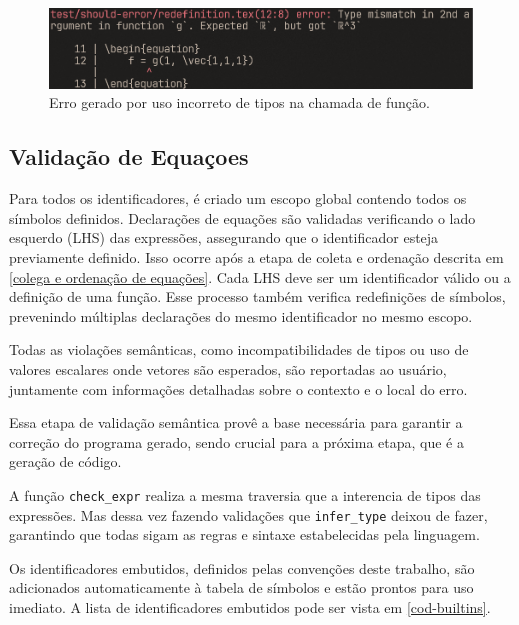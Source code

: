 \begin{figure}[H]
    \caption{\label{fig-type-mismatch} \small Erro gerado por uso incorreto de tipos na chamada de função.}
    \begin{center}
        \includegraphics[scale=0.5]{./Imagens/error-type-mismatch.png}
    \end{center}
\end{figure}

\subsection{Validação de Equaçoes}

Para todos os identificadores, é criado um escopo global contendo todos os símbolos definidos. Declarações de equações são validadas verificando o lado esquerdo (LHS) das expressões, assegurando que o identificador esteja previamente definido. Isso ocorre após a etapa de coleta e ordenação descrita em \autoref{colega e ordenação de equações}. Cada LHS deve ser um identificador válido ou a definição de uma função. Esse processo também verifica redefinições de símbolos, prevenindo múltiplas declarações do mesmo identificador no mesmo escopo.

Todas as violações semânticas, como incompatibilidades de tipos ou uso de valores escalares onde vetores são esperados, são reportadas ao usuário, juntamente com informações detalhadas sobre o contexto e o local do erro.

Essa etapa de validação semântica provê a base necessária para garantir a correção do programa gerado, sendo crucial para a próxima etapa, que é a geração de código.

A função \verb"check_expr" realiza a mesma traversia que a interencia de tipos das expressões. Mas dessa vez fazendo validações que \texttt{infer\_type} deixou de fazer, garantindo que todas sigam as regras e sintaxe estabelecidas pela linguagem.

Os identificadores embutidos, definidos pelas convenções deste trabalho, são adicionados automaticamente à tabela de símbolos e estão prontos para uso imediato. A lista de identificadores embutidos pode ser vista em \autoref{cod-builtins}.

